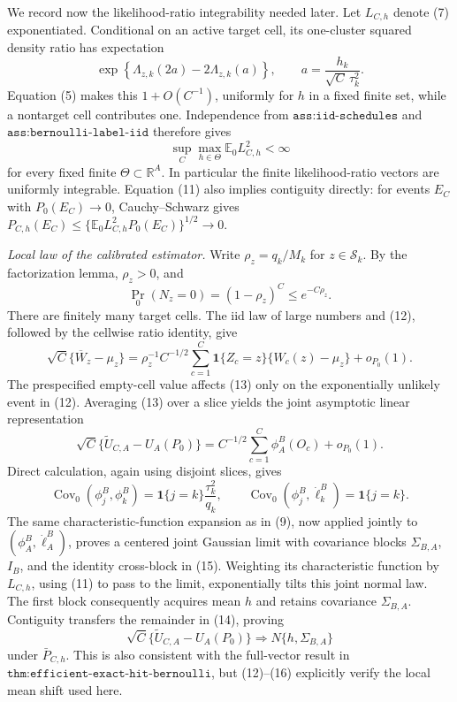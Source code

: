 We record now the likelihood-ratio integrability needed later.  Let \(L_{C,h}\) denote (7) exponentiated.  Conditional on an active target cell, its one-cluster squared density ratio has expectation
\[
 \exp\!\left\{\Lambda_{z,k}(2a)-2\Lambda_{z,k}(a)\right\},
 \qquad a=\frac{h_k}{\sqrt C\,\tau_k^2}.
\]
Equation (5) makes this \(1+O(C^{-1})\), uniformly for \(h\) in a fixed finite set, while a nontarget cell contributes one.  Independence from \(\texttt{ass:iid-schedules}\) and \(\texttt{ass:bernoulli-label-iid}\) therefore gives
\[
 \sup_C\max_{h\in\Theta}\mathbb E_0L_{C,h}^2<\infty              \tag{11}
\]
for every fixed finite \(\Theta\subset\mathbb R^A\).  In particular the finite likelihood-ratio vectors are uniformly integrable.  Equation (11) also implies contiguity directly: for events \(E_C\) with \(P_0(E_C)\to0\), Cauchy--Schwarz gives \(P_{C,h}(E_C)\leq\{\mathbb E_0L_{C,h}^2P_0(E_C)\}^{1/2}\to0\).

\emph{Local law of the calibrated estimator.}
Write \(\rho_z=q_k/M_k\) for \(z\in\mathcal S_k\).  By the factorization lemma, \(\rho_z>0\), and
\[
 \Pr_0(N_z=0)=(1-\rho_z)^C\leq e^{-C\rho_z}.                       \tag{12}
\]
There are finitely many target cells.  The iid law of large numbers and (12), followed by the cellwise ratio identity, give
\[
 \sqrt C\{\overline W_z-\mu_z\}
 =\rho_z^{-1}C^{-1/2}\sum_{c=1}^C
   \mathbf 1\{Z_c=z\}\{W_c(z)-\mu_z\}+o_{P_0}(1).                \tag{13}
\]
The prespecified empty-cell value affects (13) only on the exponentially unlikely event in (12).  Averaging (13) over a slice yields the joint asymptotic linear representation
\[
 \sqrt C\{\widetilde U_{C,A}-U_A(P_0)\}
 =C^{-1/2}\sum_{c=1}^C\phi_A^B(O_c)+o_{P_0}(1).                   \tag{14}
\]
Direct calculation, again using disjoint slices, gives
\[
 \operatorname{Cov}_0(\phi_j^B,\phi_k^B)
 =\mathbf 1\{j=k\}\frac{\tau_k^2}{q_k},
 \qquad
 \operatorname{Cov}_0(\phi_j^B,\dot\ell_k^B)=\mathbf 1\{j=k\}. \tag{15}
\]
The same characteristic-function expansion as in (9), now applied jointly to \((\phi_A^B,\dot\ell_A^B)\), proves a centered joint Gaussian limit with covariance blocks \(\Sigma_{B,A}\), \(I_B\), and the identity cross-block in (15).  Weighting its characteristic function by \(L_{C,h}\), using (11) to pass to the limit, exponentially tilts this joint normal law.  The first block consequently acquires mean \(h\) and retains covariance \(\Sigma_{B,A}\).  Contiguity transfers the remainder in (14), proving
\[
 \sqrt C\{\widetilde U_{C,A}-U_A(P_0)\}
 \Rightarrow N\{h,\Sigma_{B,A}\}                                 \tag{16}
\]
under \(\bar P_{C,h}\).  This is also consistent with the full-vector result in \(\texttt{thm:efficient-exact-hit-bernoulli}\), but (12)--(16) explicitly verify the local mean shift used here.

